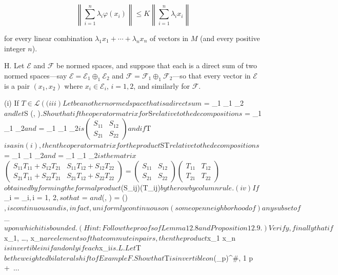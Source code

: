 $$\left\| \sum_{i=1}^{n} \lambda_i \varphi(x_i) \right\| \leq K \left\| \sum_{i=1}^{n} \lambda_i x_i \right\|$$

for every linear combination $\lambda_1 x_1 + \cdots + \lambda_n x_n$ of vectors in $M$ (and every positive integer $n$).

H. Let $\mathcal{E}$ and $\mathcal{F}$ be normed spaces, and suppose that each is a direct sum of two normed spaces—say $\mathcal{E} = \mathcal{E}_1 \oplus_1 \mathcal{E}_2$ and $\mathcal{F} = \mathcal{F}_1 \oplus_1 \mathcal{F}_2$—so that every vector in $\mathcal{E}$ is a pair $(x_1, x_2)$ where $x_i \in \mathcal{E}_i$, $i = 1, 2$, and similarly for $\mathcal{F}$.

(i) If $T \in \mathcal{L}(\mathcal

(iii) Let $$ be another normed space that is a direct sum $ = _1 \oplus_1 _2$ and let $S \in {}(, )$. Show that if the operator matrix for $S$ relative to the decompositions $ = _1 \oplus_1 _2$ and $ = _1 \oplus_1 _2$ is

$$\begin{pmatrix} S_{11} & S_{12} \\ S_{21} & S_{22} \end{pmatrix}$$

and if $T$ is as in (i), then the operator matrix for the product $ST$ relative to the decompositions $ = _1 \oplus_1 _2$ and $ = _1 \oplus_1 _2$ is the matrix

$$\begin{pmatrix} S_{11} T_{11} + S_{12} T_{21} & S_{11} T_{12} + S_{12} T_{22} \\ S_{21} T_{11} + S_{22} T_{21} & S_{21} T_{12} + S_{22} T_{22} \end{pmatrix} = \begin{pmatrix} S_{11} & S_{12} \\ S_{21} & S_{22} \end{pmatrix} \begin{pmatrix} T_{11} & T_{12} \\ T_{21} & T_{22} \end{pmatrix}$$

obtained by forming the formal product $(S_{ij})(T_{ij})$ by the row by column rule.

(iv) If $_i = _i$, $i = 1, 2$, so that $ = $ and $(, ) = ()$,

is continuous and is, in fact, uniformly continuous on (some open neighborhood of) any subset of $_{}$ upon which it is bounded. (Hint: Follow the proofs of Lemma 12.8 and Proposition 12.9.) Verify, finally that if $x_1, \ldots, x_n$ are elements of $$ that commute in pairs, then the product $x_1 \cdots x_n$ is invertible in $$ if and only if each $x_i$ is.

L. Let $T$ be the weighted bilateral shift of Example F. Show that $T$ is invertible on $(\ell_p)^{\#}, 1 \leq p \leq +\
...

